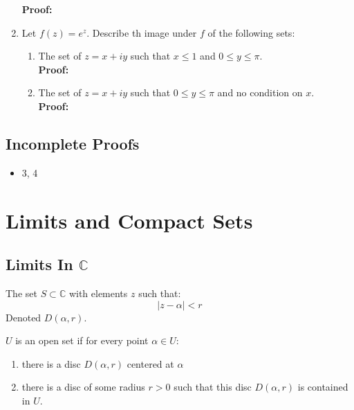 \begin{enumerate}
	\textbf{Proof:} \\

	\item Let $f(z) = e^z.$ Describe th image under $f$ of the following sets:
	\begin{enumerate}
		\item The set of $z = x + iy$ such that $x \leq 1$ and $0 \leq y \leq \pi.$ \\
		
		\textbf{Proof:} \\

		\item The set of $z = x + iy$ such that $0 \leq y \leq \pi$ and no condition on $x.$ \\
		
		\textbf{Proof:} \\

	\end{enumerate}
	
\end{enumerate}

\subsection{Incomplete Proofs}
\begin{itemize}
	\item 3, 4
\end{itemize}


\section{Limits and Compact Sets}
\subsection{Limits In $\mathbb{C}$}

\begin{defn}
	The set $S \subset \mathbb{C}$ with elements $z$ such that:
	\[ |z - \alpha | < r \]
	Denoted $D(\alpha, r).$
\end{defn}

\begin{defn}
	$U$ is an open set if for every point $\alpha \in U$:
	\begin{enumerate}
		\item there is a disc $D(\alpha,r)$ centered at $\alpha$
		\item there is a disc of some radius $r > 0$ such that this disc $D(\alpha, r)$ is contained in $U.$
	\end{enumerate}
\end{defn}

